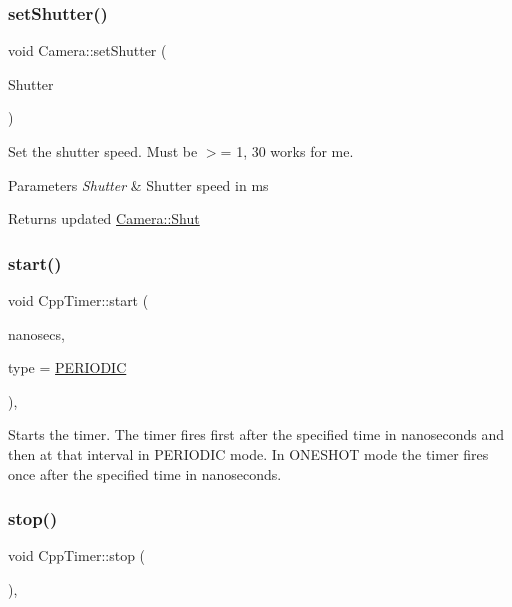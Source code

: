\subsubsection{\texorpdfstring{set\+Shutter()}{setShutter()}}
{\footnotesize\ttfamily void Camera\+::set\+Shutter (\begin{DoxyParamCaption}\item[{int}]{Shutter }\end{DoxyParamCaption})}

Set the shutter speed. Must be $>$= 1, 30 works for me.


\begin{DoxyParams}{Parameters}
{\em Shutter} & Shutter speed in ms\\
\hline
\end{DoxyParams}
\begin{DoxyReturn}{Returns}
updated \hyperlink{classCamera_ad3d6176cdcccecd116f2e7867b642ad1}{Camera\+::\+Shut} 
\end{DoxyReturn}
\mbox{\label{classCppTimer_a64989025caa3c030c6c397ca76a2d20b}} 
\subsubsection{\texorpdfstring{start()}{start()}}
{\footnotesize\ttfamily void Cpp\+Timer\+::start (\begin{DoxyParamCaption}\item[{long}]{nanosecs,  }\item[{\hyperlink{CppTimer_8h_a110d07ab6a96d7815149d3d95435790a}{cpp\+Timer\+Type\+\_\+t}}]{type = {\ttfamily \hyperlink{CppTimer_8h_a110d07ab6a96d7815149d3d95435790aae4379d044711537d9ce3b3b58c575c58}{P\+E\+R\+I\+O\+D\+IC}} }\end{DoxyParamCaption})\hspace{0.3cm}{\ttfamily [virtual]}, {\ttfamily [inherited]}}

Starts the timer. The timer fires first after the specified time in nanoseconds and then at that interval in P\+E\+R\+I\+O\+D\+IC mode. In O\+N\+E\+S\+H\+OT mode the timer fires once after the specified time in nanoseconds. \mbox{\label{classCppTimer_a4bb95ddee98a536d0818b8f6096bf7e7}} 
\subsubsection{\texorpdfstring{stop()}{stop()}}
{\footnotesize\ttfamily void Cpp\+Timer\+::stop (\begin{DoxyParamCaption}{ }\end{DoxyParamCaption})\hspace{0.3cm}{\ttfamily [virtual]}, {\ttfamily [inherited]}}

